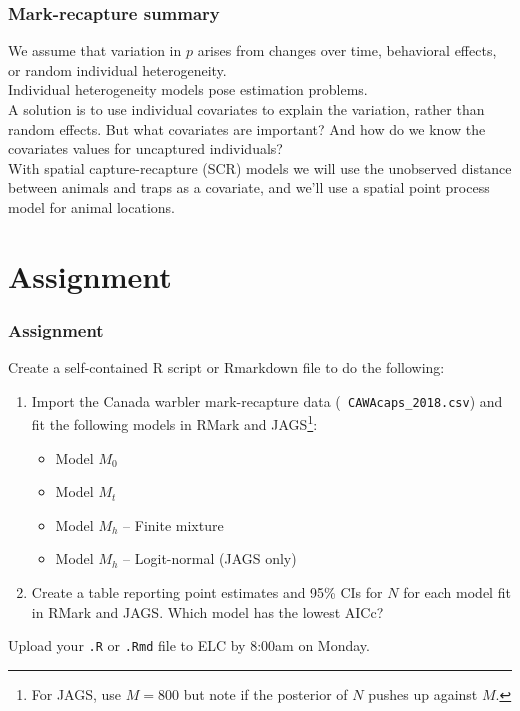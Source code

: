 \documentclass[color=usenames,dvipsnames]{beamer}\usepackage[]{graphicx}\usepackage[]{xcolor}
\begin{document}
\begin{frame}
  \frametitle{Mark-recapture summary}
  We assume that variation in $p$ arises from changes over time,
  behavioral effects, or random individual heterogeneity. \\
  \pause \vfill
  Individual heterogeneity models pose estimation problems. \\
  \pause \vfill
  A solution is to use individual covariates to explain the variation,
  rather than random effects. \pause But what covariates are
  important? And how do we know the covariates values for uncaptured
  individuals? \\
  \pause \vfill
  With spatial capture-recapture (SCR) models we will use
  \alert{the unobserved distance between animals and traps} as a
  covariate, and we'll use a spatial point process model for
  animal locations.  
\end{frame}




\section{Assignment}




\begin{frame}[fragile]
  \frametitle{Assignment}
  \small
  Create a self-contained R script or Rmarkdown file to do the
  following: 
  \vfill
  \begin{enumerate}
    \small
    \item Import the Canada warbler mark-recapture data ({\tt
        CAWAcaps\_2018.csv}) and fit the following models in RMark and
      JAGS\footnote{For JAGS, use $M=800$ but note if the posterior of
      $N$ pushes up against $M$.}:
      \begin{itemize}
        \item Model $M_0$
        \item Model $M_t$ 
        \item Model $M_h$ -- Finite mixture
        \item Model $M_h$ -- Logit-normal (JAGS only)
      \end{itemize}
    \item Create a table reporting point estimates and 95\% CIs for
      $N$ for each model fit in RMark and JAGS. Which model has the
      lowest AICc? 
  \end{enumerate}
  \vfill
  Upload your {\tt .R} or {\tt .Rmd} file to ELC by 8:00am on Monday.
\end{frame}
\end{document}

